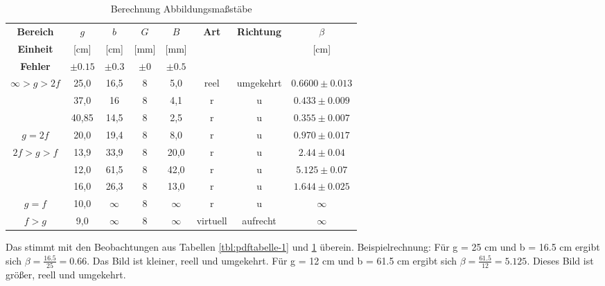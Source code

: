\documentclass[12pt,a4paper,titlepage]{scrartcl}
\numberwithin{equation}{section}
\numberwithin{table}{section}
\numberwithin{figure}{section}
\begin{document}
\begin{table}[h]
    \centering
    \caption{Berechnung Abbildungsmaßstäbe}
    \label{tbl:Abbildungsmaßstäbe}
    \medskip
    \renewcommand{\arraystretch}{1.5}

    \begin{tabular}{|c|c|c|c|c|c|c|c|}
        \hline
        \textbf{Bereich} & \textbf{$g$} & \textbf{$b$} & \textbf{$G$} & \textbf{$B$} & \textbf{Art} & \textbf{Richtung} & \textbf{$\beta$} \\
        \textbf{Einheit} & [cm] & [cm] & [mm] & [mm] & & & [cm] \\
        \textbf{Fehler} &$\pm 0.15$ & $\pm 0.3$ &$\pm 0$ &$\pm 0.5$ & & & \\
        \hline
        \multirow{3}{*}{$\infty > g > 2f$} & 25,0 & 16,5 & 8 & 5,0 & reel & umgekehrt & $0.6600\pm 0.013 $ \\
        \cline{2-8}
        & 37,0 & 16 & 8 & 4,1 & r & u & $0.433\pm 0.009 $ \\
        \cline{2-8}
        & 40,85 & 14,5 & 8 & 2,5 & r & u & $0.355\pm 0.007 $ \\
        \hline
        $g = 2f$ & 20,0 & 19,4 & 8 & 8,0 & r & u & $0.970\pm 0.017 $ \\
        \hline
        \multirow{3}{*}{$2f > g > f$} & 13,9 & 33,9 & 8 & 20,0 & r & u & $2.44\pm 0.04 $ \\
        \cline{2-8}
        & 12,0 & 61,5 & 8 & 42,0 & r & u & $5.125\pm 0.07 $ \\
        \cline{2-8}
        & 16,0 & 26,3 & 8 & 13,0 & r & u & $1.644\pm 0.025 $ \\
        \hline
        $g = f$ & 10,0 & $\infty$ & 8 & $\infty$ & r & u & $\infty $ \\
        \hline
        $f > g$ & 9,0 & $\infty$ & 8 & $\infty$ & virtuell & aufrecht & $\infty $ \\
        \hline
    \end{tabular}
\end{table}



Das stimmt mit den Beobachtungen aus Tabellen \ref{tbl:pdftabelle-1} und \ref{tbl:Abbildungsmaßstäbe} überein. 
Beispielrechnung: Für g = 25 cm und b = 16.5 cm ergibt sich $\beta = \frac{16.5}{25} = 0.66$\footnotemark. Das Bild ist kleiner, reell und umgekehrt.
Für g = 12 cm und b = 61.5 cm ergibt sich $\beta = \frac{61.5}{12} = 5.125$. Dieses Bild ist größer, reell und umgekehrt.
\end{document}
